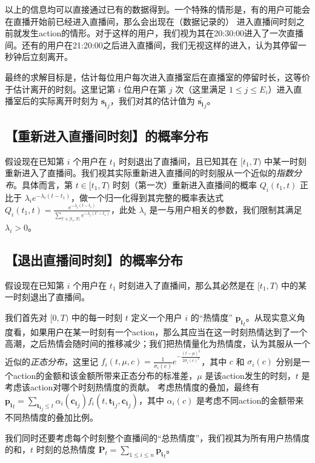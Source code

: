 \documentclass{article} %
\begin{document}
以上的信息均可以直接通过已有的数据得到。一个特殊的情形是，有的用户可能会在直播开始前已经进入直播间，那么会出现在（数据记录的）  进入直播间时刻之前就发生action的情形。对于这样的用户，我们视为其在20:30:00进入了一次直播间。还有的用户在21:20:00之后进入直播间，我们无视这样的进入，认为其停留一秒钟后立刻离开。

最终的求解目标是，估计每位用户每次进入直播室后在直播室的停留时长，这等价于估计离开的时刻。这里记第 $i$ 位用户在第 $j$ 次（这里满足 $1\leq j \leq E_i$）进入直播室后的实际离开时刻为 $\mathbf{s_i}_j$，我们对其的估计值为 $\widetilde{\mathbf{s_i}_j}$。

\subsection{【重新进入直播间时刻】的概率分布}
\label{re-enter-prob}

假设现在已知第 $i$ 个用户在 $t_1$ 时刻退出了直播间，且已知其在 $[t_1,T)$ 中某一时刻重新进入了直播间。我们视其实际重新进入直播间的时刻服从一个近似的\emph{指数分布}。具体而言，第 $t\in[t_1,T)$ 时刻（第一次）重新进入直播间的概率 $Q_i(t_1,t)$ 正比于 $\lambda_i e^{-\lambda_i(t-t_1)}$，做一个归一化得到其完整的概率表达式 $Q_i(t_1,t)=\frac{e^{-\lambda_i(t-t_1)}}{\sum_{t'\in[t_1,T)}e^{-\lambda_i(t'-t_1)}}$，此处 $\lambda_i$ 是一与用户相关的参数，我们限制其满足 $\lambda_i>0$。

\subsection{【退出直播间时刻】的概率分布}
\label{exit_prob}

假设现在已知第 $i$ 个用户在 $t_1$ 时刻进入了直播间，那么其必然是在 $[t_1,T)$ 中的某一时刻退出了直播间。

我们首先对 $[0,T)$ 中的每一时刻 $t$ 定义一个用户 $i$ 的“热情度” $\mathbf{p_i}_t$。从现实意义角度看，如果用户在某一时刻有一个action，那么其应当在这一时刻热情达到了一个高潮，之后热情会随时间的推移减少；我们把热情量化为热情度，认为其服从一个近似的\emph{正态分布}，这里记 $f_{i}(t,\mu,c)=\frac{1}{\sigma_i(c)}e^{-\frac{(t-\mu)^2}{2\sigma_i(c)^2}}$，其中 $c$ 和 $\sigma_i(c)$ 分别是一个action的金额和该金额所带来正态分布的标准差，$\mu$ 是该action发生的时刻，$t$ 是考虑该action对哪个时刻热情度的贡献。 考虑热情度的叠加，最终有 $\mathbf{p_i}_t=\sum_{\mathbf{t_i}_j \leq t}\alpha_{i}(\mathbf{c_i}_j)f_{i}(t,\mathbf{t_i}_j,\mathbf{c_i}_j)$，其中 $\alpha_i(c)$ 是考虑不同action的金额带来不同热情度的叠加比例。

我们同时还要考虑每个时刻整个直播间的“总热情度”，我们视其为所有用户热情度的和，$t$ 时刻的总热情度 $\mathbf{P}_t=\sum_{1\leq i \leq n}\mathbf{p_i}_t$。
\end{document}
